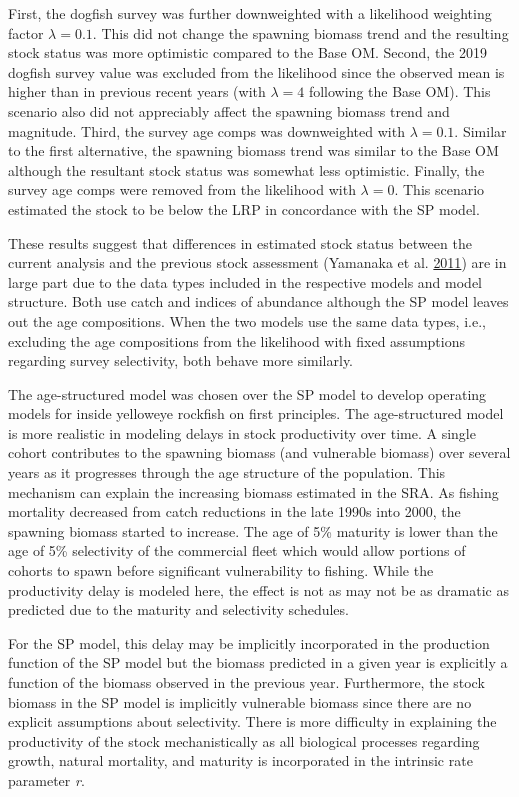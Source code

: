 \documentclass[11pt]{book}
\begin{document}
First, the dogfish survey was further downweighted with a likelihood weighting factor \(\lambda = 0.1\). This did not change the spawning biomass trend and the resulting stock status was more optimistic compared to the Base OM. Second, the 2019 dogfish survey value was excluded from the likelihood since the observed mean is higher than in previous recent years (with \(\lambda = 4\) following the Base OM). This scenario also did not appreciably affect the spawning biomass trend and magnitude. Third, the survey age comps was downweighted with \(\lambda = 0.1\). Similar to the first alternative, the spawning biomass trend was similar to the Base OM although the resultant stock status was somewhat less optimistic. Finally, the survey age comps were removed from the likelihood with \(\lambda = 0\). This scenario estimated the stock to be below the LRP in concordance with the SP model.

These results suggest that differences in estimated stock status between the current analysis and the previous stock assessment (Yamanaka et al. \protect\hyperlink{ref-yamanaka2011}{2011}) are in large part due to the data types included in the respective models and model structure. Both use catch and indices of abundance although the SP model leaves out the age compositions. When the two models use the same data types, i.e., excluding the age compositions from the likelihood with fixed assumptions regarding survey selectivity, both behave more similarly.

The age-structured model was chosen over the SP model to develop operating models for inside yelloweye rockfish on first principles. The age-structured model is more realistic in modeling delays in stock productivity over time. A single cohort contributes to the spawning biomass (and vulnerable biomass) over several years as it progresses through the age structure of the population. This mechanism can explain the increasing biomass estimated in the SRA. As fishing mortality decreased from catch reductions in the late 1990s into 2000, the spawning biomass started to increase. The age of 5\% maturity is lower than the age of 5\% selectivity of the commercial fleet which would allow portions of cohorts to spawn before significant vulnerability to fishing. While the productivity delay is modeled here, the effect is not as may not be as dramatic as predicted due to the maturity and selectivity schedules.

For the SP model, this delay may be implicitly incorporated in the production function of the SP model but the biomass predicted in a given year is explicitly a function of the biomass observed in the previous year. Furthermore, the stock biomass in the SP model is implicitly vulnerable biomass since there are no explicit assumptions about selectivity. There is more difficulty in explaining the productivity of the stock mechanistically as all biological processes regarding growth, natural mortality, and maturity is incorporated in the intrinsic rate parameter \emph{r}.
\end{document}
